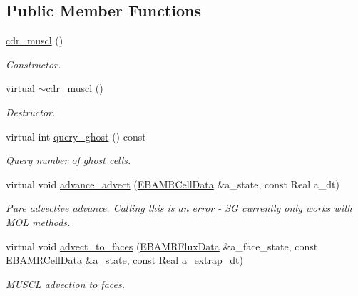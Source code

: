 \subsection*{Public Member Functions}
\begin{DoxyCompactItemize}
\item 
\hyperlink{classcdr__muscl_a5aabb98363342698533bf711c9c2c208}{cdr\+\_\+muscl} ()
\begin{DoxyCompactList}\small\item\em Constructor. \end{DoxyCompactList}\item 
virtual \hyperlink{classcdr__muscl_a82b711d7f24c159589f0f4c204cda742}{$\sim$cdr\+\_\+muscl} ()
\begin{DoxyCompactList}\small\item\em Destructor. \end{DoxyCompactList}\item 
virtual int \hyperlink{classcdr__muscl_adc56e1ed855a1ac976d70f861c4b0d70}{query\+\_\+ghost} () const 
\begin{DoxyCompactList}\small\item\em Query number of ghost cells. \end{DoxyCompactList}\item 
virtual void \hyperlink{classcdr__muscl_af8d69051cbfd9333cca82cfeb24cec37}{advance\+\_\+advect} (\hyperlink{type__definitions_8H_a7e610f301989e5e07781c5e338bdb7c3}{E\+B\+A\+M\+R\+Cell\+Data} \&a\+\_\+state, const Real a\+\_\+dt)
\begin{DoxyCompactList}\small\item\em Pure advective advance. Calling this is an error -\/ SG currently only works with M\+OL methods. \end{DoxyCompactList}\item 
virtual void \hyperlink{classcdr__muscl_affe96e20e2e2a3710dafa704a7c855d4}{advect\+\_\+to\+\_\+faces} (\hyperlink{type__definitions_8H_aadad278b2e5d3d4abcf9032f90ba78c3}{E\+B\+A\+M\+R\+Flux\+Data} \&a\+\_\+face\+\_\+state, const \hyperlink{type__definitions_8H_a7e610f301989e5e07781c5e338bdb7c3}{E\+B\+A\+M\+R\+Cell\+Data} \&a\+\_\+state, const Real a\+\_\+extrap\+\_\+dt)
\begin{DoxyCompactList}\small\item\em M\+U\+S\+CL advection to faces. \end{DoxyCompactList}\end{DoxyCompactItemize}
